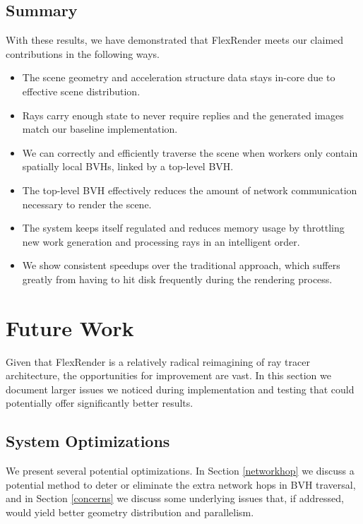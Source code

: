 \documentclass[12pt]{ucthesis}
\begin{document}
\section{Summary}
\label{resultssummary}

With these results, we have demonstrated that FlexRender meets our claimed
contributions in the following ways. 

\begin{itemize}
    \item The scene geometry and acceleration structure data stays in-core due
        to effective scene distribution.
    \item Rays carry enough state to never require replies and the generated
        images match our baseline implementation.
    \item We can correctly and efficiently traverse the scene when workers
        only contain spatially local BVHs, linked by a top-level BVH.
    \item The top-level BVH effectively reduces the amount of network
        communication necessary to render the scene.
    \item The system keeps itself regulated and reduces memory usage by
        throttling new work generation and processing rays in an intelligent
        order.
    \item We show consistent speedups over the traditional approach, which
        suffers greatly from having to hit disk frequently during the
        rendering process.
\end{itemize}

\chapter{Future Work}
\label{futurework}

Given that FlexRender is a relatively radical reimagining of ray tracer
architecture, the opportunities for improvement are vast. In this section we
document larger issues we noticed during implementation and testing that
could potentially offer significantly better results.

\section{System Optimizations}
\label{optimizations}

We present several potential optimizations. In Section \ref{networkhop} we
discuss a potential method to deter or eliminate the extra network hops in BVH
traversal, and in Section \ref{concerns} we discuss some underlying issues that,
if addressed, would yield better geometry distribution and parallelism.
\end{document}
